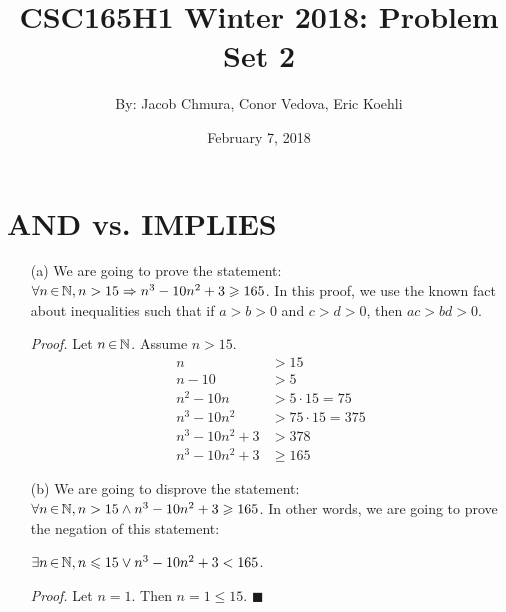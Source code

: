 \documentclass[12pt]{article}
\title{CSC165H1 Winter 2018: Problem Set 2}
\author{By: Jacob Chmura, Conor Vedova, Eric Koehli}
\date{February 7, 2018}
\newcommand{\qed}{\tag*{$\blacksquare$}}
\begin{document}
\maketitle
\newpage

\section{AND vs. IMPLIES}
\begin{enumerate}
\item[(a)] We are going to prove the statement: $\forall n \,{\in}\, \mathbb N, n > 15 \Rightarrow n^3 - 10n^2 + 3 \geqslant 165$. In this proof, we use the known fact about inequalities such that if $a > b > 0$ and $c > d > 0$, then $ac > bd > 0$.

\emph{Proof.} Let $n \,{\in}\, \mathbb N$. Assume $n > 15$.
  \begin{align*}
    n &> 15 \\
    n - 10 &> 5 \\
    n^2 - 10n &> 5 \cdot 15 = 75 \tag{By fact} \\
    n^3 - 10n^2 &> 75 \cdot 15 = 375 \\
    n^3 - 10n^2 + 3 &> 378 \\
    n^3 - 10n^2 + 3 &\geqslant 165
    \qed
  \end{align*}

\item[(b)] We are going to disprove the statement: $\forall n \,{\in}\, \mathbb N, n > 15 \wedge n^3 - 10n^2 + 3 \geqslant 165$. In other words, we are going to prove the negation of this statement:

$\exists n \,{\in}\, \mathbb N, n \leqslant 15 \vee n^3 -10n^2 + 3 < 165$.

\emph{Proof.} Let $n = 1$. Then $n = 1 \leqslant 15$. $\blacksquare$

\newpage
\end{enumerate}
\end{document}
